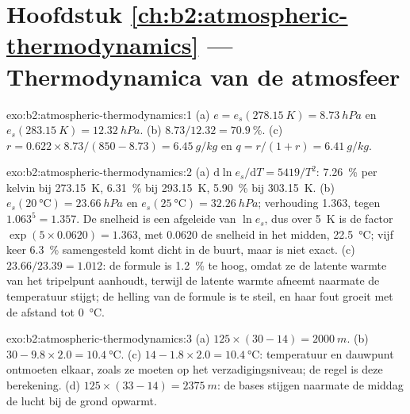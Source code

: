 \section*{Hoofdstuk \ref{ch:b2:atmospheric-thermodynamics} --- Thermodynamica van de atmosfeer}

\begin{solution}{exo:b2:atmospheric-thermodynamics:1}
(a) $e = e_s(\qty{278.15}{K}) = \qty{8.73}{hPa}$ en $e_s(\qty{283.15}{K}) = \qty{12.32}{hPa}$.
(b) $8.73/12.32 = \qty{70.9}{\percent}$. (c) $r = 0.622 \times 8.73/(850 - 8.73) =
\qty{6.45}{g/kg}$ en $q = r/(1 + r) = \qty{6.41}{g/kg}$.
\end{solution}

\begin{solution}{exo:b2:atmospheric-thermodynamics:2}
(a) $\mathrm{d}\ln e_s/\mathrm{d}T = 5419/T^2$: \qty{7.26}{\percent} per kelvin bij
\qty{273.15}{K}, \qty{6.31}{\percent} bij \qty{293.15}{K}, \qty{5.90}{\percent} bij
\qty{303.15}{K}. (b) $e_s(\qty{20}{\celsius}) = \qty{23.66}{hPa}$ en $e_s(\qty{25}{\celsius})
= \qty{32.26}{hPa}$; verhouding 1.363, tegen $1.063^5 = 1.357$. De snelheid is een afgeleide van
$\ln e_s$, dus over \qty{5}{K} is de factor $\exp(5 \times 0.0620) = 1.363$, met 0.0620 de
snelheid in het midden, \qty{22.5}{\celsius}; vijf keer \qty{6.3}{\percent} samengesteld komt dicht in de buurt,
maar is niet exact. (c) $23.66/23.39 = 1.012$: de formule is \qty{1.2}{\percent} te hoog, omdat
ze de latente warmte van het tripelpunt aanhoudt, terwijl de latente warmte afneemt naarmate de temperatuur
stijgt; de helling van de formule is te steil, en haar fout groeit met de afstand tot
\qty{0}{\celsius}.
\end{solution}

\begin{solution}{exo:b2:atmospheric-thermodynamics:3}
(a) $125 \times (30 - 14) = \qty{2000}{m}$. (b) $30 - 9.8 \times 2.0 = \qty{10.4}{\celsius}$.
(c) $14 - 1.8 \times 2.0 = \qty{10.4}{\celsius}$: temperatuur en dauwpunt ontmoeten elkaar, zoals ze moeten op
het verzadigingsniveau; de regel is deze berekening. (d) $125 \times (33 - 14) = \qty{2375}{m}$:
de bases stijgen naarmate de middag de lucht bij de grond opwarmt.
\end{solution}

